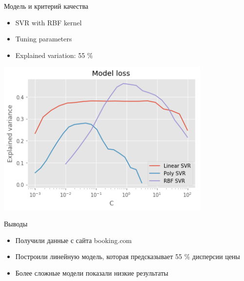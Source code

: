 \documentclass[14pt,mathserif,aspectratio=43]{beamer}
\begin{document}

\begin{frame}[label=model]{Модель и критерий качества}

    \begin{itemize}
        \item SVR with RBF kernel
        \item Tuning parameters \hyperlink{learning}{}
        \item Explained variation: 55 \% \hyperlink{ev}{}
    \end{itemize}
    
    \begin{center}
        \includegraphics[width=0.8\textwidth]{svr_loss.png}
    \end{center}
    
\end{frame}


\begin{frame}{Выводы}

    \begin{itemize}
        \item Получили данные с сайта booking.com
        \item Построили линейную модель, которая предсказывает 55 \% дисперсии цены
        \item Более сложные модели показали низкие результаты %
    \end{itemize}

\end{frame}
\end{document}
